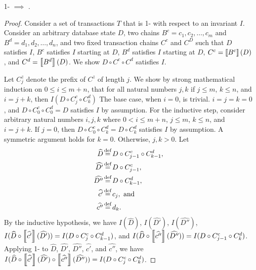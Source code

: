 \begin{claim}\label{clm:1-iconvergence-implies-iconfluence}
  1-\iconvergence{} $\implies$ \iconfluence{}.
\end{claim}
\begin{proof}
  Consider a set of \imp{} transactions $T$ that is 1-\iconvergent{} with
  respect to an invariant $I$. Consider an arbitrary database state $D$, two
  \imp{} chains $B^c = c_1, c_2, \ldots, c_m$ and $B^d = d_1, d_2, \ldots,
  d_n$, and two fixed transaction chains $C^c$ and $C^D$ such that $D$
  satisfies $I$, $B^c$ satisfies $I$ starting at $D$, $B^d$ satisfies $I$
  starting at $D$, $C^c = \left\llbracket B^c\right\rrbracket(D)$, and $C^d = \left\llbracket B^d\right\rrbracket(D)$. We
  show $D \circ C^c \circ C^d$ satisfies $I$.

  Let $C^z_j$ denote the prefix of $C^z$ of length $j$. We show by strong
  mathematical induction on $0 \leq i \leq m + n$, that for all natural numbers
  $j, k$ if
    $j \leq m$,
    $k \leq n$, and
    $i = j + k$, then
    $I(D \circ C^c_j \circ C^d_k)$
  The base case, when $i = 0$, is trivial. $i = j = k = 0$, and $D \circ C^c_0
  \circ C^d_0 = D$ satisfies $I$ by assumption.
  For the inductive step, consider arbitrary natural numbers $i, j, k$ where
    $0 < i \leq m + n$,
    $j \leq m$,
    $k \leq n$, and
    $i = j + k$.
  If $j = 0$, then $D \circ C^c_0 \circ C^d_k = D \circ C^d_k$ satisfies $I$ by
  assumption. A symmetric argument holds for $k=0$. Otherwise, $j, k > 0$. Let
  \newcommand{\wh}{\widehat}
  \begin{align*}
    \wh{D}   &\defeq D \circ C^c_{j-1} \circ C^d_{k-1}, \\
    \wh{D'}  &\defeq D \circ C^c_{j-1}, \\
    \wh{D''} &\defeq D \circ C^d_{k-1}, \\
    \wh{c'}  &\defeq c_j,\ \text{and} \\
    \wh{c''} &\defeq d_k.
  \end{align*}
  By the inductive hypothesis, we have
    $I(\wh{D})$,
    $I(\wh{D'})$,
    $I(\wh{D''})$,
    $I(\wh{D} \circ \denote{\wh{c'}}(\wh{D'}))
      = I(D \circ C^c_{j} \circ C^d_{k-1})$, and
    $I(\wh{D} \circ \denote{\wh{c''}}(\wh{D''}))
      = I(D \circ C^c_{j-1} \circ C^d_{k})$.
  Applying 1-\iconvergence{} to
    $\wh{D}$,
    $\wh{D'}$,
    $\wh{D''}$,
    $\wh{c'}$, and
    $\wh{c''}$,
  we have
    $I(\wh{D} \circ \denote{\wh{c'}}(\wh{D'})
              \circ \denote{\wh{c''}}(\wh{D''}))
      = I(D \circ C^c_j \circ C^d_k)$.
\end{proof}

